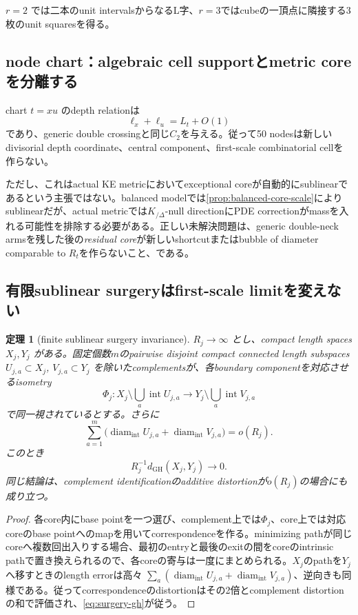 \documentclass[11pt,a4paper]{ltjsarticle}
\newtheorem{theorem}{定理}[section]
\theoremstyle{definition}
\theoremstyle{remark}
\newcommand{\diam}{\operatorname{diam}}
\newcommand{\GH}{\mathrm{GH}}
\begin{document}
$r=2$ では二本のunit intervalsからなるL字、$r=3$ではcubeの一頂点に隣接する3枚のunit squaresを得る。

\subsection{node chart：algebraic cell supportとmetric coreを分離する}

chart $t=xu$ のdepth relationは
\[
 \ell_x+\ell_u=L_t+O(1)
\]
であり、generic double crossingと同じ$C_2$を与える。従って50 nodesは新しいdivisorial depth coordinate、central component、first-scale combinatorial cellを作らない。

ただし、これはactual KE metricにおいてexceptional coreが自動的にsublinearであるという主張ではない。balanced modelでは\cref{prop:balanced-core-scale}によりsublinearだが、actual metricでは$K_{/\Delta}$-null directionにPDE correctionがmassを入れる可能性を排除する必要がある。正しい未解決問題は、generic double-neck armsを残した後の\emph{residual core}が新しいshortcutまたはbubble of diameter comparable to $R_t$を作らないこと、である。

\subsection{有限sublinear surgeryはfirst-scale limitを変えない}

\begin{theorem}[finite sublinear surgery invariance]\label{thm:sublinear-surgery}
$R_j\to\infty$ とし、compact length spaces $X_j,Y_j$ がある。固定個数$m$のpairwise disjoint compact connected length subspaces
$U_{j,a}\subset X_j$, $V_{j,a}\subset Y_j$ を除いたcomplementsが、各boundary componentを対応させるisometry
\[
 \Phi_j:X_j\setminus\bigcup_a\operatorname{int}U_{j,a}
 \longrightarrow
 Y_j\setminus\bigcup_a\operatorname{int}V_{j,a}
\]
で同一視されているとする。さらに
\[
 \sum_{a=1}^m\bigl(\diam_{\mathrm{int}} U_{j,a}+\diam_{\mathrm{int}} V_{j,a}\bigr)=o(R_j).
\]
このとき
\begin{equation}\label{eq:surgery-gh}
 R_j^{-1}d_{\GH}(X_j,Y_j)\longrightarrow0.
\end{equation}
同じ結論は、complement identificationのadditive distortionが$o(R_j)$の場合にも成り立つ。
\end{theorem}

\begin{proof}
各core内にbase pointを一つ選び、complement上では$\Phi_j$、core上では対応coreのbase pointへのmapを用いてcorrespondenceを作る。minimizing pathが同じcoreへ複数回出入りする場合、最初のentryと最後のexitの間をcoreのintrinsic pathで置き換えられるので、各coreの寄与は一度にまとめられる。$X_j$のpathを$Y_j$へ移すときのlength errorは高々
$\sum_a(\diam_{\mathrm{int}} U_{j,a}+\diam_{\mathrm{int}} V_{j,a})$、逆向きも同様である。従ってcorrespondenceのdistortionはその2倍とcomplement distortionの和で評価され、\eqref{eq:surgery-gh}が従う。
\end{proof}
\end{document}
